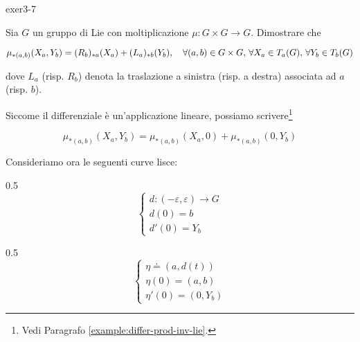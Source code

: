 {exer3-7}
{
Sia $ G $ un gruppo di Lie con moltiplicazione $ \mu : G \times G \to G $. Dimostrare che

\begin{equation}
	\mu_{*(a,b)}(X_{a},Y_{b}) = (R_{b})_{*a}(X_{a}) + (L_{a})_{*b}(Y_{b}) %
	\qcomma \forall (a,b) \in G \times G, \, \forall X_{a} \in T_{a}(G), \, \forall Y_{b} \in T_{b}(G)
\end{equation}

dove $ L_{a} $ (risp. $ R_{b} $) denota la traslazione a sinistra (risp. a destra) associata ad $ a $ (risp. $ b $).
}
{
Siccome il differenziale è un'applicazione lineare, possiamo scrivere\footnote{%
	Vedi Paragrafo \ref{example:differ-prod-inv-lie}.%
}

\begin{equation}
	\mu_{*(a,b)}(X_{a},Y_{b}) = \mu_{*(a,b)}(X_{a},0) + \mu_{*(a,b)}(0,Y_{b})
\end{equation}

Consideriamo ora le seguenti curve lisce:

	{0.5}{%
			\begin{equation}
				\begin{cases}
					d : (- \varepsilon, \varepsilon) \to G \\
					d(0) = b \\
					d'(0) = Y_{b}
				\end{cases}
			\end{equation}
	}

	{0.5}{%
			\begin{equation}
				\begin{cases}
					\eta \doteq (a, d(t)) \\
					\eta(0) = (a,b) \\
					\eta'(0) = (0, Y_{b})
				\end{cases}
			\end{equation}
			}

}
